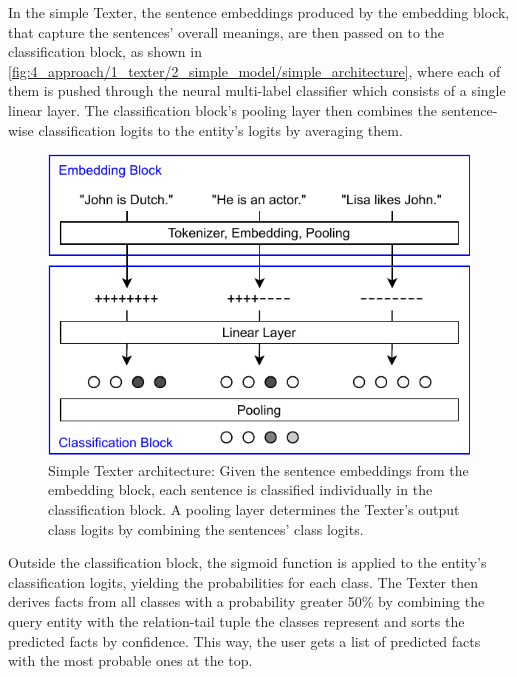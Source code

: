 In the simple Texter, the sentence embeddings produced by the embedding block, that capture the sentences' overall meanings, are then passed on to the classification block, as shown in \autoref{fig:4_approach/1_texter/2_simple_model/simple_architecture}, where each of them is pushed through the neural multi-label classifier which consists of a single linear layer. The classification block's pooling layer then combines the sentence-wise classification logits to the entity's logits by averaging them.

\begin{figure}[t]
    \centering
    \includegraphics{4_approach/1_texter/2_simple_model/simple_architecture}
    \caption{Simple Texter architecture: Given the sentence embeddings from the embedding block, each sentence is classified individually in the classification block. A pooling layer determines the Texter's output class logits by combining the sentences' class logits.}
    \label{fig:4_approach/1_texter/2_simple_model/simple_architecture}
\end{figure}

Outside the classification block, the sigmoid function is applied to the entity's classification logits, yielding the probabilities for each class. The Texter then derives facts from all classes with a probability greater 50\% by combining the query entity with the relation-tail tuple the classes represent and sorts the predicted facts by confidence. This way, the user gets a list of predicted facts with the most probable ones at the top.
